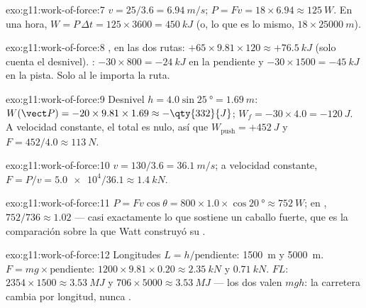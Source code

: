 \begin{solution}{exo:g11:work-of-force:7}
$v = 25/3.6 = \qty{6.94}{m/s}$;
$P = Fv = 18 \times 6.94 \approx \qty{125}{W}$. En una hora,
$W = P\,\Delta t = 125 \times 3600 = \qty{450}{kJ}$ (o, lo que es lo
mismo, $18 \times \qty{25000}{m}$).
\end{solution}

\begin{solution}{exo:g11:work-of-force:8}
, en las dos rutas:
$+65 \times 9.81 \times 120 \approx +\qty{76.5}{kJ}$ (solo cuenta el
desnivel). : $-30 \times 800 = -\qty{24}{kJ}$ en la
pendiente y $-30 \times 1500 = -\qty{45}{kJ}$ en la pista. Solo al
 le importa la ruta.
\end{solution}

\begin{solution}{exo:g11:work-of-force:9}
Desnivel $h = 4.0\sin\qty{25}{\degree} = \qty{1.69}{m}$:
$W(\vect P) = -20 \times 9.81 \times 1.69 \approx -\qty{332}{J}$;
$W_f = -30 \times 4.0 = -\qty{120}{J}$. A velocidad constante, el
 total es nulo, así que $W_{\text{push}} = +\qty{452}{J}$ y
$F = 452/4.0 \approx \qty{113}{N}$.
\end{solution}

\begin{solution}{exo:g11:work-of-force:10}
$v = 130/3.6 = \qty{36.1}{m/s}$; a velocidad constante,
$F = P/v = \num{5.0e4}/36.1 \approx \qty{1.4}{kN}$.
\end{solution}

\begin{solution}{exo:g11:work-of-force:11}
$P = Fv\cos\theta = 800 \times 1.0 \times \cos\qty{20}{\degree}
\approx \qty{752}{W}$; en ,
$752/736 \approx \num{1.02}$ --- casi exactamente lo que sostiene un
caballo fuerte, que es la comparación sobre la que Watt construyó su
.
\end{solution}

\begin{solution}{exo:g11:work-of-force:12}
Longitudes $L = h/\text{pendiente}$: \qty{1500}{m} y \qty{5000}{m}.
 $F = mg \times \text{pendiente}$:
$1200 \times 9.81 \times 0.20 \approx \qty{2.35}{kN}$ y
$\qty{0.71}{kN}$.  $FL$:
$2354 \times 1500 \approx \qty{3.53}{MJ}$ y
$706 \times 5000 \approx \qty{3.53}{MJ}$ --- los dos valen $mgh$: la
carretera cambia  por longitud, nunca .
\end{solution}

